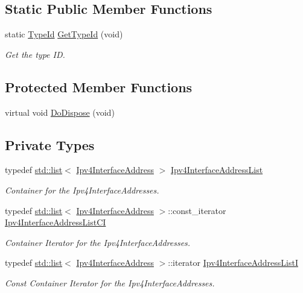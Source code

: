 \subsection*{Static Public Member Functions}
\begin{DoxyCompactItemize}
\item 
static \hyperlink{classns3_1_1TypeId}{Type\+Id} \hyperlink{classns3_1_1Ipv4Interface_a8bff93686f5fb318283386d966162349}{Get\+Type\+Id} (void)
\begin{DoxyCompactList}\small\item\em Get the type ID. \end{DoxyCompactList}\end{DoxyCompactItemize}
\subsection*{Protected Member Functions}
\begin{DoxyCompactItemize}
\item 
virtual void \hyperlink{classns3_1_1Ipv4Interface_a03f3952156c97c804eb591d94dfc6387}{Do\+Dispose} (void)
\end{DoxyCompactItemize}
\subsection*{Private Types}
\begin{DoxyCompactItemize}
\item 
typedef \hyperlink{openflow-interface_8h_afd9bcfa176617760671b67580f536fa7}{std\+::list}$<$ \hyperlink{classns3_1_1Ipv4InterfaceAddress}{Ipv4\+Interface\+Address} $>$ \hyperlink{classns3_1_1Ipv4Interface_aee3862b3d3b286dd3c950fdc0c8c9420}{Ipv4\+Interface\+Address\+List}
\begin{DoxyCompactList}\small\item\em Container for the Ipv4\+Interface\+Addresses. \end{DoxyCompactList}\item 
typedef \hyperlink{openflow-interface_8h_afd9bcfa176617760671b67580f536fa7}{std\+::list}$<$ \hyperlink{classns3_1_1Ipv4InterfaceAddress}{Ipv4\+Interface\+Address} $>$\+::const\+\_\+iterator \hyperlink{classns3_1_1Ipv4Interface_a4dac488cd96dbcc24440e23059c132dd}{Ipv4\+Interface\+Address\+List\+CI}
\begin{DoxyCompactList}\small\item\em Container Iterator for the Ipv4\+Interface\+Addresses. \end{DoxyCompactList}\item 
typedef \hyperlink{openflow-interface_8h_afd9bcfa176617760671b67580f536fa7}{std\+::list}$<$ \hyperlink{classns3_1_1Ipv4InterfaceAddress}{Ipv4\+Interface\+Address} $>$\+::iterator \hyperlink{classns3_1_1Ipv4Interface_ae60a6401347ab109569b6f6189433d7b}{Ipv4\+Interface\+Address\+ListI}
\begin{DoxyCompactList}\small\item\em Const Container Iterator for the Ipv4\+Interface\+Addresses. \end{DoxyCompactList}\end{DoxyCompactItemize}
